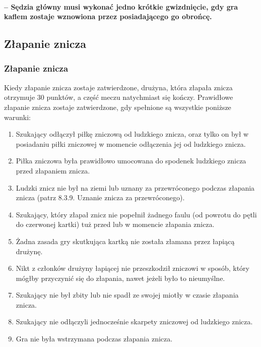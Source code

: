 \documentclass[12pt]{article}
\begin{document}
\paragraph{ -- Sędzia główny musi wykonać jedno krótkie
	gwizdnięcie, gdy gra kaflem zostaje wznowiona przez posiadającego go
	obrońcę.}

\subsection{Złapanie znicza}

\subsubsection{Złapanie znicza}

Kiedy złapanie znicza zostaje zatwierdzone, drużyna, która złapała
znicza otrzymuje 30 punktów, a część meczu natychmiast się kończy.
Prawidłowe złapanie znicza zostaje zatwierdzone, gdy spełnione są
wszystkie poniższe warunki:

\begin{enumerate}
	\item
	      Szukający odłączył piłkę zniczową od ludzkiego znicza, oraz tylko on
	      był w posiadaniu piłki zniczowej w momencie odłączenia jej od
	      ludzkiego znicza.
	\item
	      Piłka zniczowa była prawidłowo umocowana do spodenek ludzkiego znicza
	      przed złapaniem znicza.
	\item
	      Ludzki znicz nie był na ziemi lub uznany za przewróconego podczas
	      złapania znicza (patrz 8.3.9. Uznanie znicza za przewróconego).
	\item
	      Szukający, który złapał znicz nie popełnił żadnego faulu (od powrotu
	      do pętli do czerwonej kartki) tuż przed lub w momencie złapania
	      znicza.
	\item
	      Żadna zasada gry skutkująca kartką nie została złamana przez łapiącą
	      drużynę.
	\item
	      Nikt z członków drużyny łapiącej nie przeszkodził zniczowi w sposób,
	      który mógłby przyczynić się do złapania, nawet jeżeli było to
	      nieumyślne.
	\item
	      Szukający nie był zbity lub nie spadł ze swojej miotły w czasie
	      złapania znicza.
	\item
	      Szukający nie odłączyli jednocześnie skarpety zniczowej od ludzkiego
	      znicza.
	\item
	      Gra nie była wstrzymana podczas złapania znicza.
\end{enumerate}
\end{document}
